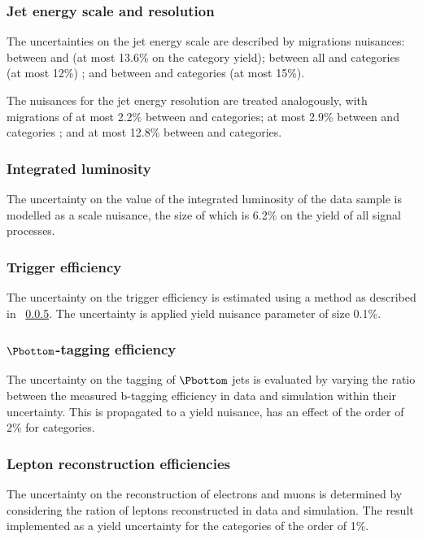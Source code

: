 \subsubsection{Jet energy scale and resolution}
The uncertainties on the jet energy scale are described by migrations nuisances: between  and  (at most 13.6\% on the category yield); between all \VBF and \Untagged categories (at most 12\%) ; and between \TTHTag and \Untagged categories (at most 15\%).

The nuisances for the jet energy resolution are treated analogously, with migrations of at most 2.2\% between  and  categories; at most 2.9\% between \VBF and \Untagged categories ; and at most 12.8\% between \TTHTag and \Untagged categories.

\subsubsection{Integrated luminosity}
The uncertainty on the value of the integrated luminosity of the data sample is modelled as a scale nuisance, the size of which is 6.2\% on the yield of all signal processes. 

\subsubsection{Trigger efficiency}
The uncertainty on the trigger efficiency is estimated using a \TagAndProbe method as described in \Sec~\ref{}. The uncertainty is applied yield nuisance parameter of size 0.1\%.

\subsubsection{$\Pbottom$-tagging  efficiency}
The uncertainty on the tagging of $\Pbottom$ jets is evaluated by varying the ratio between the measured b-tagging efficiency in data and simulation within their uncertainty. This is propagated to a yield nuisance, has an effect of the order of 2\% for \TTHTag categories.

\subsubsection{Lepton reconstruction efficiencies}
The uncertainty on the reconstruction of electrons and muons is determined by considering the ration of leptons reconstructed in data and simulation. The result implemented as a yield uncertainty for the \TTHTag categories of the order of 1\%.

